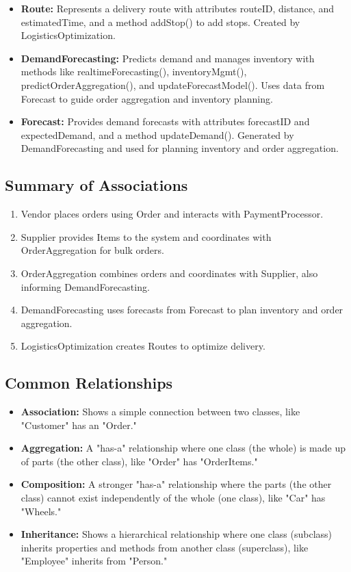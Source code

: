 \begin{itemize}
    \item \textbf{Route:} Represents a delivery route with attributes routeID, distance, and estimatedTime, and a method addStop() to add stops. Created by LogisticsOptimization.
    
    \item \textbf{DemandForecasting:} Predicts demand and manages inventory with methods like realtimeForecasting(), inventoryMgmt(), predictOrderAggregation(), and updateForecastModel(). Uses data from Forecast to guide order aggregation and inventory planning.
    
    \item \textbf{Forecast:} Provides demand forecasts with attributes forecastID and expectedDemand, and a method updateDemand(). Generated by DemandForecasting and used for planning inventory and order aggregation.
\end{itemize}
\subsection{Summary of Associations}
\begin{enumerate}
    \item Vendor places orders using Order and interacts with PaymentProcessor.
    \item Supplier provides Items to the system and coordinates with OrderAggregation for bulk orders.
    \item OrderAggregation combines orders and coordinates with Supplier, also informing DemandForecasting.
    \item DemandForecasting uses forecasts from Forecast to plan inventory and order aggregation.
    \item LogisticsOptimization creates Routes to optimize delivery.
\end{enumerate}

\subsection{Common Relationships}
\begin{itemize}
    \item \textbf{Association:} Shows a simple connection between two classes, like "Customer" has an "Order."
    \item \textbf{Aggregation:} A "has-a" relationship where one class (the whole) is made up of parts (the other class), like "Order" has "OrderItems."
    \item \textbf{Composition:} A stronger "has-a" relationship where the parts (the other class) cannot exist independently of the whole (one class), like "Car" has "Wheels."
    \item \textbf{Inheritance:} Shows a hierarchical relationship where one class (subclass) inherits properties and methods from another class (superclass), like "Employee" inherits from "Person."
\end{itemize}

